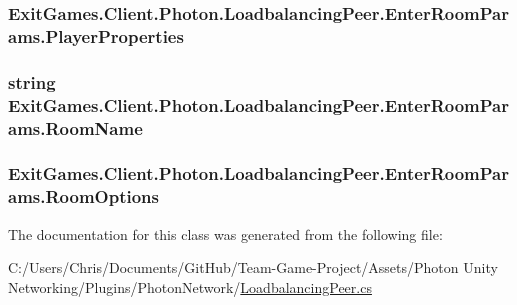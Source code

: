 \subsubsection[{\texorpdfstring{Player\+Properties}{PlayerProperties}}]{ Exit\+Games.\+Client.\+Photon.\+Loadbalancing\+Peer.\+Enter\+Room\+Params.\+Player\+Properties}\hypertarget{class_exit_games_1_1_client_1_1_photon_1_1_loadbalancing_peer_1_1_enter_room_params_a8f44933e23de1234e376a99b9f8a9a90}{}\label{class_exit_games_1_1_client_1_1_photon_1_1_loadbalancing_peer_1_1_enter_room_params_a8f44933e23de1234e376a99b9f8a9a90}
\subsubsection[{\texorpdfstring{Room\+Name}{RoomName}}]{\setlength{\rightskip}{0pt plus 5cm}string Exit\+Games.\+Client.\+Photon.\+Loadbalancing\+Peer.\+Enter\+Room\+Params.\+Room\+Name}\hypertarget{class_exit_games_1_1_client_1_1_photon_1_1_loadbalancing_peer_1_1_enter_room_params_a72afef2017538b11abfaac5d14f2b176}{}\label{class_exit_games_1_1_client_1_1_photon_1_1_loadbalancing_peer_1_1_enter_room_params_a72afef2017538b11abfaac5d14f2b176}
\subsubsection[{\texorpdfstring{Room\+Options}{RoomOptions}}]{ Exit\+Games.\+Client.\+Photon.\+Loadbalancing\+Peer.\+Enter\+Room\+Params.\+Room\+Options}\hypertarget{class_exit_games_1_1_client_1_1_photon_1_1_loadbalancing_peer_1_1_enter_room_params_ac6674e44fe94492bf0d12bf6458c0444}{}\label{class_exit_games_1_1_client_1_1_photon_1_1_loadbalancing_peer_1_1_enter_room_params_ac6674e44fe94492bf0d12bf6458c0444}


The documentation for this class was generated from the following file\+:\begin{DoxyCompactItemize}
\item 
C\+:/\+Users/\+Chris/\+Documents/\+Git\+Hub/\+Team-\/\+Game-\/\+Project/\+Assets/\+Photon Unity Networking/\+Plugins/\+Photon\+Network/\hyperlink{_loadbalancing_peer_8cs}{Loadbalancing\+Peer.\+cs}\end{DoxyCompactItemize}
